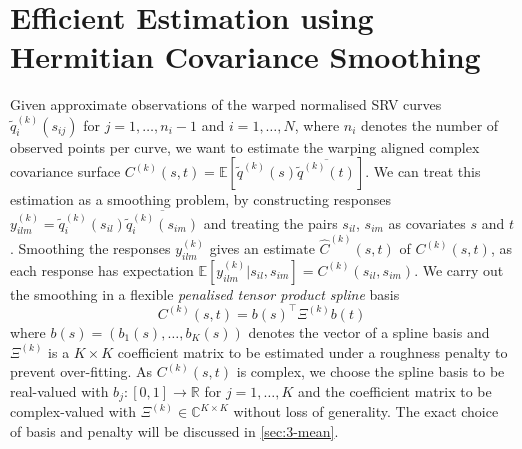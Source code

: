 \section{Efficient Estimation using Hermitian Covariance Smoothing}
\label{sec:3-cov}
Given approximate observations of the warped normalised SRV curves $\widetilde q^{(k)}_i(s_{ij})$ for $j = 1,\dots,n_i-1$ and $i=1,\dots,N$, where $n_i$ denotes the number of observed points per curve, we want to estimate the warping aligned complex covariance surface $C^{(k)}(s,t) = \mathbb{E}[\widetilde q^{(k)}(s)\overline{\widetilde q^{(k)}(t)}]$.
We can treat this estimation as a smoothing problem, by constructing responses $y^{(k)}_{ilm} = \widetilde q^{(k)}_i(s_{il}) \overline{\widetilde q^{(k)}_i(s_{im})}$ and treating the pairs $s_{il}$, $s_{im}$ as covariates $s$ and $t$ \parencite[see][]{YaoMuellerWang2005}.
Smoothing the responses $y^{(k)}_{ilm}$ gives an estimate $\hat C^{(k)}(s,t)$ of $C^{(k)}(s,t)$, as each response has expectation $\mathbb{E}[y^{(k)}_{ilm}|s_{il},s_{im}] = C^{(k)}(s_{il},s_{im})$. 
We carry out the smoothing in a flexible \emph{penalised tensor product spline} basis 
\begin{equation}
  C^{(k)}(s,t) = b(s)^\top \Xi^{(k)} b(t) 
\end{equation}
where $b(s) = (b_1(s),\dots,b_K(s))$ denotes the vector of a spline basis and $\Xi^{(k)}$ is a $K \times K$ coefficient matrix to be estimated under a roughness penalty to prevent over-fitting. 
As $C^{(k)}(s,t)$ is complex, we choose the spline basis to be real-valued with $b_j : [0,1] \rightarrow \mathbb{R}$ for $j = 1,\dots,K$ and the coefficient matrix to be complex-valued with $\Xi^{(k)} \in \mathbb{C}^{K \times K}$ without loss of generality.
The exact choice of basis and penalty will be discussed in \cref{sec:3-mean}.

